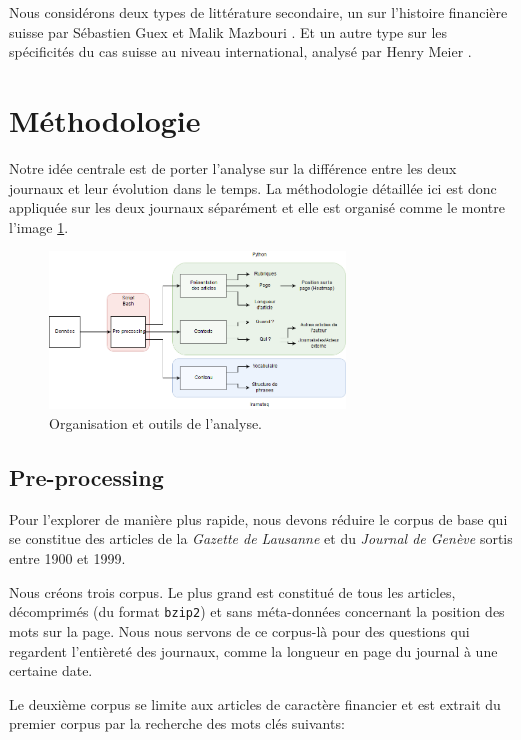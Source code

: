 \documentclass[11pt]{article}
\begin{document}
Nous considérons deux types de littérature secondaire, un sur l’histoire financière
suisse par Sébastien Guex et Malik Mazbouri \citep{Guex99, Guex00, Mazbouri12}.
Et un autre type sur les spécificités du cas suisse au niveau international,
analysé par Henry Meier \citep{Meier12}.


\hypertarget{muxe9thodologie}{%
\section{Méthodologie}\label{muxe9thodologie}}

Notre idée centrale est de porter l'analyse sur la différence entre les
deux journaux et leur évolution dans le temps. La méthodologie détaillée
ici est donc appliquée sur les deux journaux séparément et elle est
organisé comme le montre l'image \ref{methods}.

\begin{figure}
\centering
\includegraphics[width=0.7\textwidth]{methodology/methods.png}
\caption{Organisation et outils de l'analyse.}
\label{methods}
\end{figure}

\hypertarget{pre-processing}{%
\subsection{Pre-processing}\label{pre-processing}}

Pour l'explorer de manière plus rapide, nous devons réduire le corpus de
base qui se constitue des articles de la \emph{Gazette de Lausanne}
et du \emph{Journal de Genève} sortis entre 1900 et 1999.

Nous créons trois corpus. Le plus grand est constitué de tous les
articles, décomprimés (du format \texttt{bzip2}) et sans méta-données
concernant la position des mots sur la page. Nous nous servons de ce
corpus-là pour des questions qui regardent l'entièreté des journaux,
comme la longueur en page du journal à une certaine date.

Le deuxième corpus se limite aux articles de caractère financier et est
extrait du premier corpus par la recherche des mots clés suivants:
\end{document}
